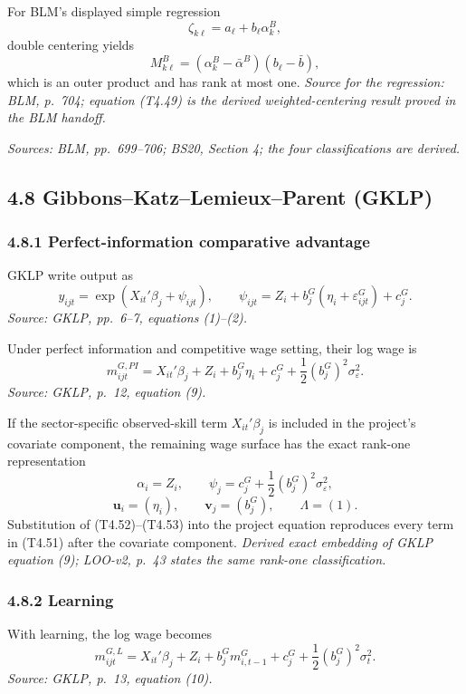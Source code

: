 \documentclass[11pt]{article}
\begin{document}
For BLM's displayed simple regression
\[
\zeta_{k\ell}=a_\ell+b_\ell\alpha_k^B,
\tag{T4.48}
\]
double centering yields
\[
M^B_{k\ell}
=
(\alpha_k^B-\bar\alpha^B)
(b_\ell-\bar b),
\tag{T4.49}
\]
which is an outer product and has rank at most one.
\textit{Source for the regression: BLM, p.\ 704; equation (T4.49) is the
derived weighted-centering result proved in the BLM handoff.}

\textit{Sources: BLM, pp.\ 699--706; BS20, Section 4; the four classifications
are derived.}

\subsection{4.8 Gibbons--Katz--Lemieux--Parent (GKLP)}

\subsubsection{4.8.1 Perfect-information comparative advantage}

GKLP write output as
\[
y_{ijt}
=
\exp(X_{it}'\beta_j+\psi_{ijt}),
\qquad
\psi_{ijt}
=
Z_i+b_j^G(\eta_i+\varepsilon_{ijt}^G)+c_j^G.
\tag{T4.50}
\]
\textit{Source: GKLP, pp.\ 6--7, equations (1)--(2).}

Under perfect information and competitive wage setting, their log wage is
\[
m_{ijt}^{G,PI}
=
X_{it}'\beta_j
+Z_i
+b_j^G\eta_i
+c_j^G
+\frac12(b_j^G)^2\sigma_\varepsilon^2.
\tag{T4.51}
\]
\textit{Source: GKLP, p.\ 12, equation (9).}

If the sector-specific observed-skill term \(X_{it}'\beta_j\) is included in
the project's covariate component, the remaining wage surface has the exact
rank-one representation
\[
\alpha_i=Z_i,
\qquad
\psi_j=c_j^G+\frac12(b_j^G)^2\sigma_\varepsilon^2,
\tag{T4.52}
\]
\[
\mathbf u_i=(\eta_i),
\qquad
\mathbf v_j=(b_j^G),
\qquad
\Lambda=(1).
\tag{T4.53}
\]
Substitution of (T4.52)--(T4.53) into the project equation reproduces every
term in (T4.51) after the covariate component.
\textit{Derived exact embedding of GKLP equation (9); LOO-v2, p.\ 43 states
the same rank-one classification.}

\subsubsection{4.8.2 Learning}

With learning, the log wage becomes
\[
m_{ijt}^{G,L}
=
X_{it}'\beta_j
+Z_i
+b_j^Gm_{i,t-1}^G
+c_j^G
+\frac12(b_j^G)^2\sigma_t^2.
\tag{T4.54}
\]
\textit{Source: GKLP, p.\ 13, equation (10).}
\end{document}
